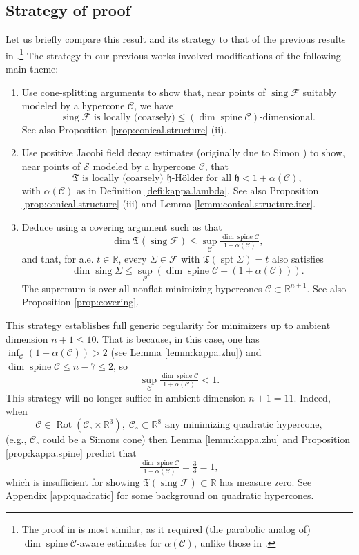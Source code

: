 \documentclass[11pt, letterpaper, reqno]{amsart}
\numberwithin{equation}{section}
\theoremstyle{remark}
\newcommand{\RR}{\mathbb{R}}
\newcommand{\cC}{\mathcal{C}}
\newcommand{\cS}{\mathcal{S}}
\newcommand{\frT}{\mathfrak{T}}
\newcommand{\supp}{\operatorname{spt}}
\newcommand{\sing}{\operatorname{sing}}
\newcommand{\spine}{\operatorname{spine}}
\newcommand{\Rot}{\operatorname{Rot}}
\begin{document}
\subsection{Strategy of proof} \label{subsec:strat-proof} Let us briefly compare this result and its strategy to that of the previous results in  \cite{CMS:generic.9.10, CMS:generic.codim.plus.2, CMS:generic.mcf.high.dim}.\footnote{The proof in \cite{CMS:generic.mcf.high.dim} is most similar, as it required (the parabolic analog of) $\dim \spine \cC$-aware estimates for $\alpha(\cC)$, unlike those in \cite{CMS:generic.9.10, CMS:generic.codim.plus.2}.} The strategy in our previous works involved modifications of the following main theme:
\begin{enumerate}
	\item[(i)] Use cone-splitting arguments to show that, near points of $\sing \mathscr{F}$ suitably modeled by a hypercone $\cC$, we have
		\[ \sing \mathscr{F} \text{ is locally (coarsely)} \leq (\dim \spine \cC)\text{-dimensional}. \]
		 See also Proposition \ref{prop:conical.structure} (ii).
	\item[(ii)] Use positive Jacobi field decay estimates (originally due to Simon \cite{Simon:decay}) to show, near points of $\cS$ modeled by a hypercone $\cC$, that
		\[ \frT \text{ is locally (coarsely) } \mathfrak{h}\text{-H\"older} \text{ for all } \mathfrak{h} < 1 + \alpha(\cC), \]
		with $\alpha(\cC)$ as in Definition \ref{defi:kappa.lambda}. See also Proposition \ref{prop:conical.structure} (iii) and Lemma \ref{lemm:conical.structure.iter}.
	\item[(iii)] Deduce using a covering argument such as \cite[Corollary 7.8]{FROS:ihes} that
		\[ \dim \frT(\sing \mathscr{F}) \leq \sup_{\cC} \tfrac{\dim \spine \cC}{1 + \alpha(\cC)}, \]
		and that, for a.e. $t \in \RR$, every $\Sigma \in \mathscr{F}$ with $\frT(\supp \Sigma) = t$ also satisfies
		\[ \dim \sing \Sigma \leq \sup_{\cC} (\dim \spine \cC - (1 + \alpha(\cC))). \]
		The supremum is over all nonflat minimizing hypercones $\cC \subset \RR^{n+1}$. See also Proposition \ref{prop:covering}.
\end{enumerate}

This strategy establishes full generic regularity for minimizers up to ambient dimension $n+1 \leq 10$. That is because, in this case, one has $\inf_\cC (1 + \alpha(\cC)) > 2$ (see Lemma \ref{lemm:kappa.zhu}) and $\dim \spine \cC \leq n-7 \leq 2$, so
\[ \sup_{\cC} \tfrac{\dim \spine \cC}{1 + \alpha(\cC)} < 1. \]
This strategy will no longer suffice in ambient dimension $n+1=11$. Indeed, when
\[ \cC \in \Rot(\cC_\circ \times \RR^3), \; \cC_\circ \subset \RR^8 \text{ any minimizing quadratic hypercone}, \]
(e.g., $\cC_\circ$ could be a Simons cone) then Lemma \ref{lemm:kappa.zhu} and Proposition \ref{prop:kappa.spine} predict  that
\[ \tfrac{\dim \spine \cC}{1 + \alpha(\cC)} = \tfrac{3}{3} = 1, \]
which is insufficient for showing $\frT(\sing \mathscr{F}) \subset \RR$ has measure zero. See Appendix \ref{app:quadratic} for some background on quadratic hypercones.
\end{document}
